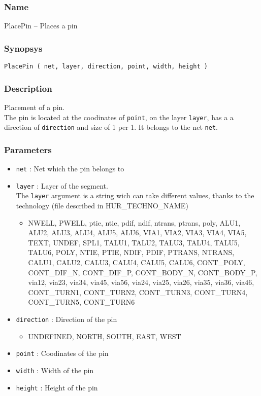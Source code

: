 \subsubsection{Name}

PlacePin -- Places a pin

\subsubsection{Synopsys}

\begin{verbatim}
PlacePin ( net, layer, direction, point, width, height )
\end{verbatim}

\subsubsection{Description}

Placement of a pin.\\
\indent The pin is located at the coodinates of \verb-point-, on the layer \verb-layer-, has a a direction of \verb-direction- and size of 1 per 1. It belongs to the net \verb-net-.
    
\subsubsection{Parameters}

\begin{itemize}
    \item \verb-net- : Net which the pin belongs to
    \item \verb-layer- : Layer of the segment.\\The \verb-layer- argument is a string wich can take different values, thanks to the technology (file described in HUR\_TECHNO\_NAME)
    \begin{itemize}
        \item NWELL, PWELL, ptie, ntie, pdif, ndif, ntrans, ptrans, poly, ALU1, ALU2, ALU3, ALU4, ALU5, ALU6, VIA1, VIA2, VIA3, VIA4, VIA5, TEXT, UNDEF, SPL1, TALU1, TALU2, TALU3, TALU4, TALU5, TALU6, POLY, NTIE, PTIE, NDIF, PDIF, PTRANS, NTRANS, CALU1, CALU2, CALU3, CALU4, CALU5, CALU6, CONT\_POLY, CONT\_DIF\_N, CONT\_DIF\_P, CONT\_BODY\_N, CONT\_BODY\_P, via12, via23, via34, via45, via56, via24, via25, via26, via35, via36, via46, CONT\_TURN1, CONT\_TURN2, CONT\_TURN3, CONT\_TURN4, CONT\_TURN5, CONT\_TURN6
    \end{itemize}
    \item \verb-direction- : Direction of the pin
    \begin{itemize}
        \item UNDEFINED, NORTH, SOUTH, EAST, WEST
    \end{itemize}
    \item \verb-point- : Coodinates of the pin
    \item \verb-width- : Width of the pin
    \item \verb-height- : Height of the pin
\end{itemize}
    
